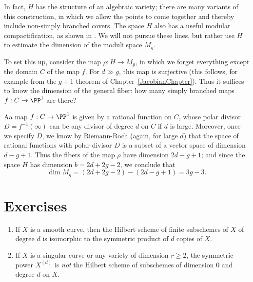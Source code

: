 In fact, $H$ has the structure of an algebraic variety; there are many variants of this construction, in which we allow the points to come together and thereby include non-simply branched covers. The space $H$ also has a useful modular compactification, as shown in \cite{Harris-Mumford-Moduli}. We will not pursue these lines, but rather use $H$
to estimate the dimension of the moduli space $M_g$.

To set this up, consider the map $\rho : H \to M_g$, in which we forget everything except the domain $C$ of the map $f$. For $d \gg g$, this map is surjective (this follows, for example from the $g+1$ theorem of Chapter~\ref{JacobianChapter}). Thus it suffices to know the dimension of the general fiber: how many simply branched maps $f : C \to \PP^1$ are there?

Aa map $f : C \to \PP^1$ is given by a rational function on $C$, whose polar divisor $D = f^{-1}(\infty)$ can be any divisor of degree $d$ on $C$ if $d$ is large. Moreover, once we specify $D$, we know by Riemann-Roch (again, for large $d$) that the space of rational functions with polar divisor $D$ is a subset of a vector space of dimension $d-g+1$. Thus the fibers of the map $\rho$ have dimension $2d-g+1$; and since the space $H$ has dimension $b = 2d+2g-2$, we conclude that
$$
\dim M_g = (2d+2g-2)-(2d-g+1) = 3g-3.
$$

\section{Exercises}

\begin{exercise}\label{symmetric power vs Hilbert scheme}
\begin{enumerate}
 \item If $X$ is a smooth curve, then the Hilbert scheme of finite subschemes of $X$ of degree $d$ is
 isomorphic to the symmetric product of $d$ copies of $X$.
 \item If $X$ is a singular curve or any variety of dimension $r \geq 2$, the symmetric power $X^{(d)}$ is \emph{not} the Hilbert scheme of subschemes of dimension 0 and degree $d$ on $X$. 
 
\end{enumerate}
 \end{exercise}


